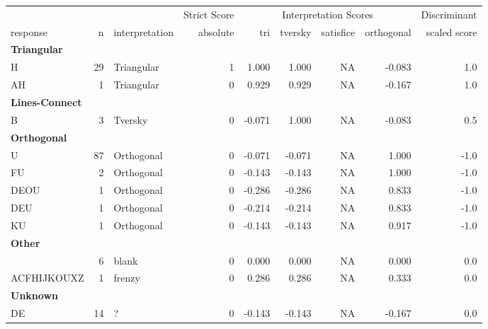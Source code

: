 \documentclass[
  letterpaper,
  DIV=11,
  numbers=noendperiod]{scrreprt}
\begin{document}
\begin{tabular}[t]{l|r|l|r|r|r|r|r|r}
\hline
\multicolumn{3}{c|}{ } & \multicolumn{1}{c|}{Strict Score} & \multicolumn{4}{c|}{Interpretation Scores} & \multicolumn{1}{c}{Discriminant} \\
\cline{4-4} \cline{5-8} \cline{9-9}
response & n & interpretation & absolute & tri & tversky & satisfice & orthogonal & scaled score\\
\hline
\multicolumn{9}{l}{\textbf{Triangular}}\\
\hline
\hspace{1em}H & 29 & Triangular & 1 & 1.000 & 1.000 & NA & -0.083 & 1.0\\
\hline
\hspace{1em}AH & 1 & Triangular & 0 & 0.929 & 0.929 & NA & -0.167 & 1.0\\
\hline
\multicolumn{9}{l}{\textbf{Lines-Connect}}\\
\hline
\hspace{1em}B & 3 & Tversky & 0 & -0.071 & 1.000 & NA & -0.083 & 0.5\\
\hline
\multicolumn{9}{l}{\textbf{Orthogonal}}\\
\hline
\hspace{1em}U & 87 & Orthogonal & 0 & -0.071 & -0.071 & NA & 1.000 & -1.0\\
\hline
\hspace{1em}FU & 2 & Orthogonal & 0 & -0.143 & -0.143 & NA & 1.000 & -1.0\\
\hline
\hspace{1em}DEOU & 1 & Orthogonal & 0 & -0.286 & -0.286 & NA & 0.833 & -1.0\\
\hline
\hspace{1em}DEU & 1 & Orthogonal & 0 & -0.214 & -0.214 & NA & 0.833 & -1.0\\
\hline
\hspace{1em}KU & 1 & Orthogonal & 0 & -0.143 & -0.143 & NA & 0.917 & -1.0\\
\hline
\multicolumn{9}{l}{\textbf{Other}}\\
\hline
\hspace{1em} & 6 & blank & 0 & 0.000 & 0.000 & NA & 0.000 & 0.0\\
\hline
\hspace{1em}ACFHIJKOUXZ & 1 & frenzy & 0 & 0.286 & 0.286 & NA & 0.333 & 0.0\\
\hline
\multicolumn{9}{l}{\textbf{Unknown}}\\
\hline
\hspace{1em}DE & 14 & ? & 0 & -0.143 & -0.143 & NA & -0.167 & 0.0\\

\end{tabular}
\end{document}
